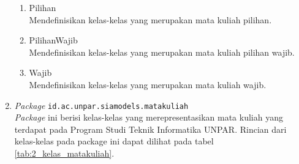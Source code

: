 \begin{enumerate}
\begin{enumerate}
		\item Pilihan\\
		Mendefinisikan kelas-kelas yang merupakan mata kuliah pilihan.
		\item PilihanWajib\\
		Mendefinisikan kelas-kelas yang merupakan mata kuliah pilihan wajib.
		\item Wajib\\
		Mendefinisikan kelas-kelas yang merupakan mata kuliah wajib.
	\end{enumerate}
	
	\item \textit{Package} \texttt{id.ac.unpar.siamodels.matakuliah}\\
	\textit{Package} ini berisi kelas-kelas yang merepresentasikan mata kuliah yang terdapat pada Program Studi Teknik Informatika UNPAR. Rincian dari kelas-kelas pada package ini dapat dilihat pada tabel \ref{tab:2_kelas_matakuliah}.


\end{enumerate}
